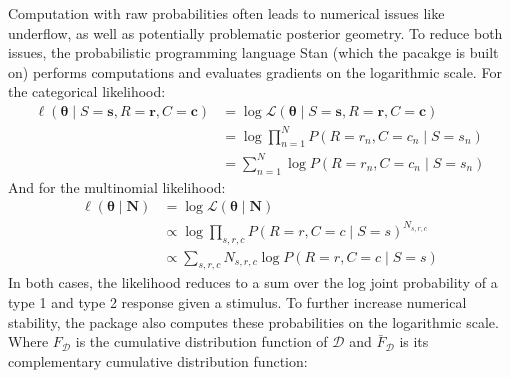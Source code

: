 Computation with raw probabilities often leads to numerical issues like underflow, as well as potentially problematic posterior geometry. To reduce both issues, the probabilistic programming language Stan (which the \hmetad{} pacakge is built on) performs computations and evaluates gradients on the logarithmic scale. For the categorical likelihood:
\begin{align*}
    \ell(\bm{\theta} \;\vert\; S=\bm{s},R=\bm{r},C=\bm{c}) &= \log\mathcal{L}(\bm{\theta} \;\vert\; S=\bm{s},R=\bm{r},C=\bm{c}) \\
    &= \log\prod_{n=1}^N P(R=r_n, C=c_n \;\vert\; S=s_n) \\
    &= \sum_{n=1}^N \log P(R=r_n, C=c_n \;\vert\; S=s_n)
\end{align*}
And for the multinomial likelihood:
\begin{align*}
    \ell(\bm{\theta} \;\vert\; \bm{N}) &= \log \mathcal{L}(\bm{\theta} \;\vert\; \bm{N}) \\
    &\propto \log \prod_{s,r,c} P(R=r, C=c \;\vert\; S=s)^{N_{s,r,c}} \\
    &\propto \sum_{s,r,c} N_{s,r,c} \log P(R=r, C=c \;\vert\; S=s)
\end{align*}
In both cases, the likelihood reduces to a sum over the log joint probability of a type 1 and type 2 response given a stimulus. To further increase numerical stability, the \hmetad{} package also computes these probabilities on the logarithmic scale. Where $F_{\mathcal{D}}$ is the cumulative distribution function of $\mathcal{D}$ and $\bar{F}_{\mathcal{D}}$ is its complementary cumulative distribution function:

